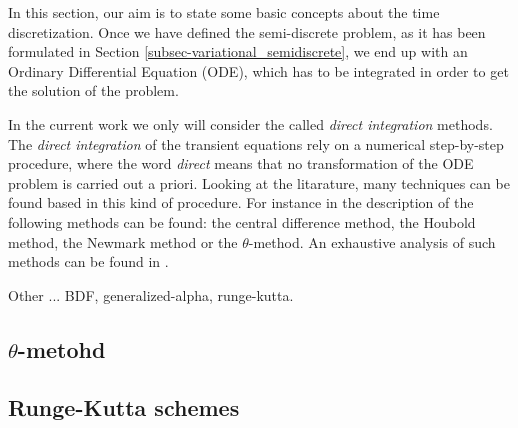 In this section, our aim is to state some basic concepts about the time discretization. Once we have defined the semi-discrete problem, as it has been formulated in Section \ref{subsec-variational_semidiscrete}, we end up with an Ordinary Differential Equation (ODE), which has to be integrated in order to get the solution of the problem.

In the current work we only will consider the called \textit{direct integration} methods. The \textit{direct integration} of the transient equations rely on a numerical step-by-step procedure, where the word \textit{direct} means that no transformation of the ODE problem is carried out a priori. Looking at the litarature, many techniques can be found based in this kind of procedure. For instance in \cite{Per Klaus-Jürgen Bathe} the description of the following methods can be found: the central difference method, the Houbold method, the Newmark method or the $ \theta $-method. An exhaustive analysis of such methods can be found in \cite{belytscho_hughes}.

Other ... BDF, generalized-alpha, runge-kutta.


\subsection{$ \theta $-metohd}
\subsection{Runge-Kutta schemes}